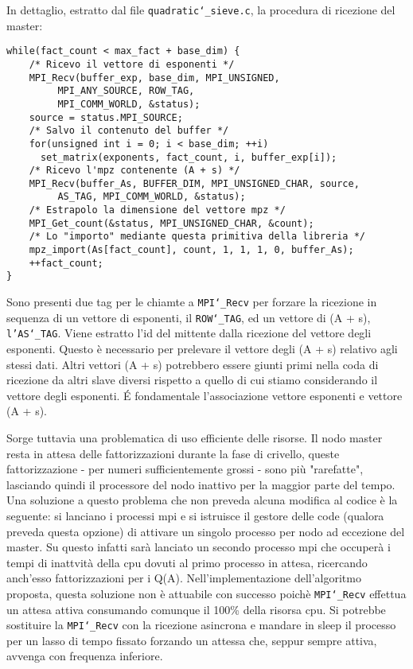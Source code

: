 In dettaglio, estratto dal file \texttt{quadratic\char`_sieve.c}, la procedura
di ricezione del master:
\begin{lstlisting}
while(fact_count < max_fact + base_dim) {
    /* Ricevo il vettore di esponenti */
    MPI_Recv(buffer_exp, base_dim, MPI_UNSIGNED,
	     MPI_ANY_SOURCE, ROW_TAG, 
	     MPI_COMM_WORLD, &status);
    source = status.MPI_SOURCE;
    /* Salvo il contenuto del buffer */
    for(unsigned int i = 0; i < base_dim; ++i) 
      set_matrix(exponents, fact_count, i, buffer_exp[i]);
    /* Ricevo l'mpz contenente (A + s) */
    MPI_Recv(buffer_As, BUFFER_DIM, MPI_UNSIGNED_CHAR, source, 
	     AS_TAG, MPI_COMM_WORLD, &status);
    /* Estrapolo la dimensione del vettore mpz */
    MPI_Get_count(&status, MPI_UNSIGNED_CHAR, &count);
    /* Lo "importo" mediante questa primitiva della libreria */
    mpz_import(As[fact_count], count, 1, 1, 1, 0, buffer_As);
    ++fact_count;
}
\end{lstlisting}
Sono presenti due tag per le chiamte a \texttt{MPI\char`_Recv} per forzare la
ricezione in sequenza di un vettore di esponenti, il \texttt{ROW\char`_TAG}, ed un
vettore di (A + s), \texttt{l'AS\char`_TAG}. Viene estratto l'id del mittente dalla
ricezione del vettore degli esponenti. Questo è necessario per
prelevare il vettore degli (A + s) relativo agli stessi dati. Altri
vettori (A + s) potrebbero essere giunti primi nella coda di ricezione
da altri slave diversi rispetto a quello di cui stiamo considerando il
vettore degli esponenti. \'E fondamentale l'associazione vettore
esponenti e vettore (A + s).

Sorge tuttavia una problematica di uso efficiente delle risorse. Il
nodo master resta in attesa delle fattorizzazioni durante la fase di
crivello, queste fattorizzazione - per numeri sufficientemente grossi
- sono più "rarefatte", lasciando quindi il processore del nodo
inattivo per la maggior parte del tempo. Una soluzione a questo
problema che non preveda alcuna modifica al codice è la seguente:
si lanciano i processi mpi e si istruisce il gestore delle code
(qualora preveda questa opzione)  di attivare un singolo processo 
per nodo ad eccezione del master. Su questo infatti sarà lanciato un
secondo processo mpi che occuperà i tempi di inattvità della cpu
dovuti al primo processo in attesa, ricercando anch'esso
fattorizzazioni per i Q(A). Nell'implementazione dell'algoritmo
proposta, questa soluzione non è
attuabile con  successo poichè \texttt{MPI\char`_Recv} effettua un attesa attiva
consumando comunque il 100\% della risorsa cpu. Si potrebbe sostituire
la \texttt{MPI\char`_Recv} con la ricezione asincrona e mandare in sleep il processo
per un lasso di tempo fissato forzando un attessa che, seppur sempre
attiva, avvenga con frequenza inferiore.
